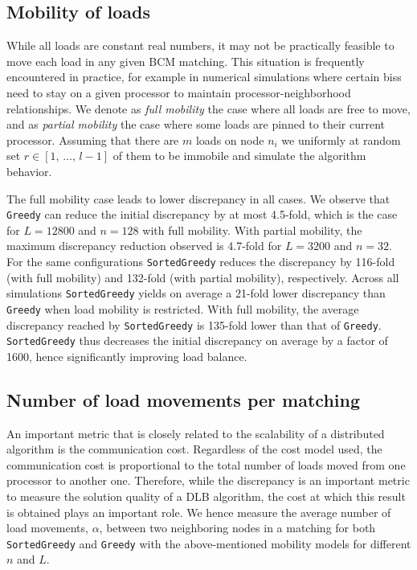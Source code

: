 \documentclass[12pt,psfig,a4]{article}
\newcommand{\sg}{\texttt{SortedGreedy}}
\newcommand{\gr}{\texttt{Greedy}}
\theoremstyle{plain}
\begin{document}
\subsection{Mobility of loads}

While all loads are constant real numbers, it may not be practically feasible to move each load in any given BCM matching. This situation is frequently encountered in practice, for example in numerical simulations where certain biss need to stay on a given processor to maintain processor-neighborhood relationships. We denote as \textit{full mobility} the case where all loads are free to move, and as \textit{partial mobility} the case where some loads are pinned to their current processor. Assuming that there are $m$ loads on node $n_i$ we uniformly at random set $r\in[1,\,\ldots,\,l-1]$ of them to be immobile and simulate the algorithm behavior.

The full mobility case leads to lower discrepancy in all cases. We observe that \gr{} can reduce the initial discrepancy by at most 4.5-fold, which is the case for $L=12800$ and $n=128$ with full mobility. With partial mobility, the maximum discrepancy reduction observed is 4.7-fold for $L=3200$ and $n=32$. For the same configurations \sg{} reduces the discrepancy by 116-fold (with full mobility) and 132-fold (with partial mobility), respectively. Across all simulations \sg{} yields on average a 21-fold lower discrepancy than \gr{} when load mobility is restricted. With full mobility, the average discrepancy reached by \sg{} is 135-fold lower than that of \gr{}. \sg{} thus decreases the initial discrepancy on average by a factor of 1600, hence significantly improving load balance.

\subsection{Number of load movements per matching}

An important metric that is closely related to the scalability of a distributed algorithm is the communication cost. Regardless of the cost model used, the communication cost is proportional to the total number of loads moved from one processor to another one. Therefore, while the discrepancy is an important metric to measure the solution quality of a DLB algorithm, the cost at which this result is obtained plays an important role. We hence measure the average number of load movements, $\alpha$, between two neighboring nodes in a matching for both \sg{} and \gr{} with the above-mentioned mobility models for different $n$ and $L$.
\end{document}
